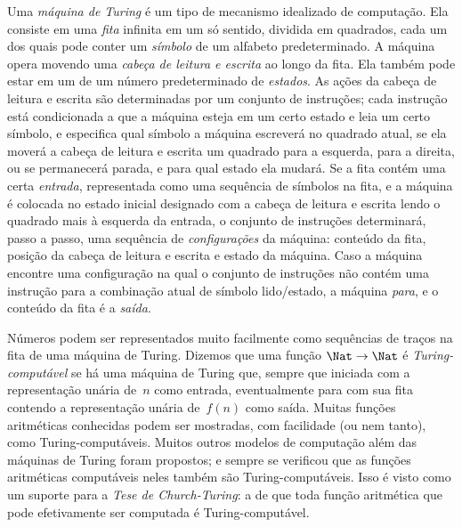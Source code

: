 Uma \emph{máquina de Turing} é um tipo de mecanismo idealizado de computação.
Ela consiste em uma \emph{fita} infinita em um só sentido, dividida em
quadrados, cada um dos quais pode conter um \emph{símbolo} de um
alfabeto predeterminado. A máquina opera movendo uma
\emph{cabeça de leitura e escrita} ao longo da fita. Ela também pode estar em
um de um número predeterminado de \emph{estados}. As ações da cabeça de
leitura e escrita são determinadas por um conjunto de instruções; cada
instrução está condicionada a que a máquina esteja em um certo estado e leia
um certo símbolo, e especifica qual símbolo a máquina escreverá no
quadrado atual, se ela moverá a cabeça de leitura e escrita um
quadrado para a esquerda, para a direita, ou se permanecerá parada, e
para qual estado ela mudará. Se a fita contém uma certa \emph{entrada},
representada como uma sequência de símbolos na fita, e a máquina é
colocada no estado inicial designado com a cabeça de leitura e escrita lendo
o quadrado mais à esquerda da entrada, o conjunto de instruções determinará,
passo a passo, uma sequência de \emph{configurações} da máquina: conteúdo da
fita, posição da cabeça de leitura e escrita e estado da máquina. Caso a
máquina encontre uma configuração na qual o conjunto de instruções não
contém uma instrução para a combinação atual de símbolo lido/estado,
a máquina \emph{para}, e o conteúdo da fita é a \emph{saída}.

Números podem ser representados muito facilmente como sequências de traços na
fita de uma máquina de Turing. Dizemos que uma função $\Nat \to \Nat$ é
\emph{Turing-computável} se há uma máquina de Turing que, sempre que
iniciada com a representação unária de~$n$ como entrada, eventualmente
para com sua fita contendo a representação unária de~$f(n)$ como
saída. Muitas funções aritméticas conhecidas podem ser mostradas, com
facilidade (ou nem tanto), como Turing-computáveis. Muitos outros modelos de
computação além das máquinas de Turing foram propostos; e sempre se
verificou que as funções aritméticas computáveis neles também são
Turing-computáveis. Isso é visto como um suporte para a
\emph{Tese de Church-Turing}: a de que toda função aritmética que pode
efetivamente ser computada é Turing-computável.
